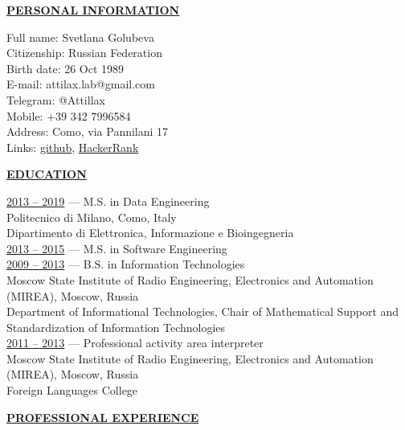 \documentclass[a4paper,10pt,fullpage]{article}
\begin{document}

\begin{center}
	\underline{\textbf{PERSONAL INFORMATION}}
\end{center}

Full name: \hfill Svetlana Golubeva\\
Citizenship: \hfill Russian Federation\\
Birth date: \hfill 26 Oct 1989\\
E-mail: \hfill attilax.lab@gmail.com \\
Telegram: \hfill @Attillax \\
Mobile: \hfill +39 342 7996584 \\
Address: \hfill Como, via Pannilani 17\\
Links: \hfill  \href{https://github.com/attillax}{github}, 
\href{https://www.hackerrank.com/attillax}{HackerRank}\\

\begin{center}
	\underline{\textbf{EDUCATION}}
\end{center}	

\underline{2013 -- 2019} --- M.S. in Data Engineering \\
Politecnico di Milano, Como, Italy\\
Dipartimento di Elettronica, Informazione e Bioingegneria\\

\underline{2013 -- 2015} --- M.S. in Software Engineering \\
\underline{2009 -- 2013} --- B.S. in Information Technologies \\
Moscow State Institute of Radio Engineering, Electronics and Automation (MIREA), Moscow,
 Russia\\
Department of Informational Technologies, Chair of Mathematical Support and 
Standardization of Information Technologies\\

\underline{2011 -- 2013} --- Professional activity area interpreter \\
Moscow State Institute of Radio Engineering, Electronics and Automation (MIREA), Moscow,
 Russia\\
Foreign Languages College\\

\begin{center}
	\underline{\textbf{PROFESSIONAL EXPERIENCE}}
\end{center}	
\end{document}
